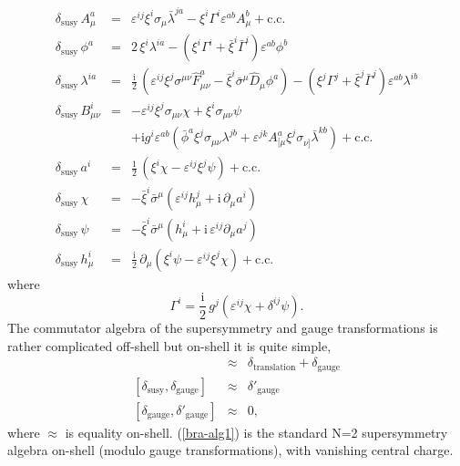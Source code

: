 \documentclass[a4paper,12pt]{article}
\begin{document}
\begin{eqnarray*}
\delta_\mathrm{susy}\, A^a_\mu &=& 
\varepsilon^{ij}\xi^i\sigma_\mu \bar \lambda^{ja}
- \xi^i {\Gamma^{i}} \varepsilon^{ab} A^b_\mu+\mbox{c.c.}
\\
\delta_\mathrm{susy}\, \phi^a &=& 2\, \xi^i\lambda^{ia}
- (\xi^i {\Gamma^{i}}+\bar \xi^i {\bar \Gamma^{i}}) \varepsilon^{ab}\phi^b
\\
\delta_\mathrm{susy}\, \lambda^{ia} &=& \frac{{\mathrm{i}}}2\, 
(\varepsilon^{ij}
                   \xi^j \sigma^{\mu\nu}{\hat F^a_{\mu\nu}}
-\bar \xi^i\bar \sigma^\mu {\hat D_\mu}\phi^a)
-(\xi^j {\Gamma^j}+\bar \xi^j \bar \Gamma^j) \varepsilon^{ab} \lambda^{ib}
\\
\delta_\mathrm{susy}\, B_{\mu\nu}^i&=&
-\varepsilon^{ij}\xi^j\sigma_{\mu\nu}\chi+\xi^i\sigma_{\mu\nu}\psi
\\
&&+{\mathrm{i}} g^i\varepsilon^{ab}(\bar \phi^a\xi^j\sigma_{\mu\nu}\lambda^{jb}
+\varepsilon^{jk}A_{[\mu}^a\xi^j\sigma^{}_{\nu]}\bar \lambda^{kb})
+\mbox{c.c.}
\\
\delta_\mathrm{susy}\, a^i&=&
\frac 12\, (\xi^i\chi-\varepsilon^{ij}\xi^j\psi)+\mbox{c.c.}
\\
\delta_\mathrm{susy}\,\chi&=&-\bar \xi^i\bar \sigma^\mu(
\varepsilon^{ij}{h_\mu^j}+{\mathrm{i}}\, \partial _\mu a^i)
\\
\delta_\mathrm{susy}\,\psi&=&-\bar \xi^i\bar \sigma^\mu(
{h_\mu^i}+{\mathrm{i}}\, \varepsilon^{ij}\partial _\mu a^j)
\\
\delta_\mathrm{susy}\, {h_\mu^i}&=&
\frac{{\mathrm{i}}}2\, \partial _\mu (\xi^i\psi-\varepsilon^{ij}\xi^j\chi)
+\mbox{c.c.}
\end{eqnarray*}
where
\[
{\Gamma^i}=\frac {{\mathrm{i}}}2\,  
{g^j}(\varepsilon^{ij}\chi+\delta^{ij}\psi).
\]
The commutator
algebra of the supersymmetry and gauge transformations is
rather complicated off-shell but on-shell it is quite simple,
\begin{eqnarray}
[\delta^{}_\mathrm{susy},\delta'_\mathrm{susy}]
&\approx&\delta_\mathrm{translation}+\delta_\mathrm{gauge}
\label{bra-alg1}\\
{}[\delta_\mathrm{susy},\delta_\mathrm{gauge}]&\approx& 
\delta'_\mathrm{gauge}
\label{bra-alg2}\\
{}[\delta^{}_\mathrm{gauge},\delta'_\mathrm{gauge}]&\approx& 0,
\label{bra-alg3}
\end{eqnarray}
where $\approx$ is equality on-shell. (\ref{bra-alg1}) is the
standard N=2 supersymmetry algebra on-shell
(modulo gauge transformations),
with vanishing central charge.
\end{document}
